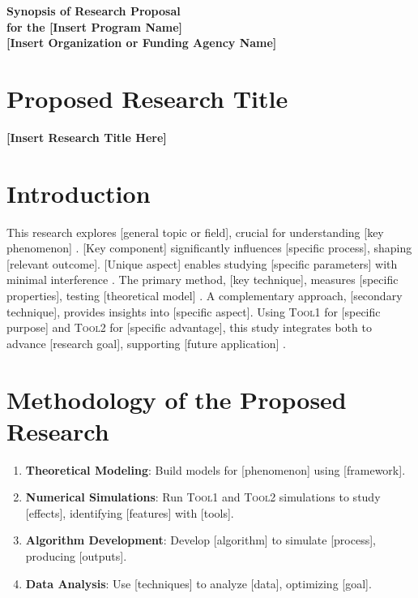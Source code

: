 \documentclass[a4paper,12pt]{article}
\newcommand{\gev}{\textsc{Tool1}\xspace}
\newcommand{\scr}{\textsc{Tool2}\xspace}
\begin{document}
\begin{center}
    \textbf{\large Synopsis of Research Proposal \\ for the [Insert Program Name]} \\
    \vspace{0.2cm}
    \textbf{[Insert Organization or Funding Agency Name]} \\
\end{center}

\section*{Proposed Research Title}
\begin{center}
    \textbf{[Insert Research Title Here]}
\end{center}

\section*{Introduction}
This research explores [general topic or field], crucial for understanding [key phenomenon] \cite{peebles1980,aghanim2020}. [Key component] significantly influences [specific process], shaping [relevant outcome]. [Unique aspect] enables studying [specific parameters] with minimal interference \cite{aghanim2020}. The primary method, [key technique], measures [specific properties], testing [theoretical model] \cite{adamek2016}. A complementary approach, [secondary technique], provides insights into [specific aspect]. Using \gev for [specific purpose] and \scr for [specific advantage], this study integrates both to advance [research goal], supporting [future application] \cite{eingorn2022}.

\section*{Methodology of the Proposed Research}
\begin{enumerate}[label=\alph*.]
    \item \textbf{Theoretical Modeling}: Build models for [phenomenon] using [framework].
    \item \textbf{Numerical Simulations}: Run \gev and \scr simulations to study [effects], identifying [features] with [tools].
    \item \textbf{Algorithm Development}: Develop [algorithm] to simulate [process], producing [outputs].
    \item \textbf{Data Analysis}: Use [techniques] to analyze [data], optimizing [goal].
\end{enumerate}
\end{document}
